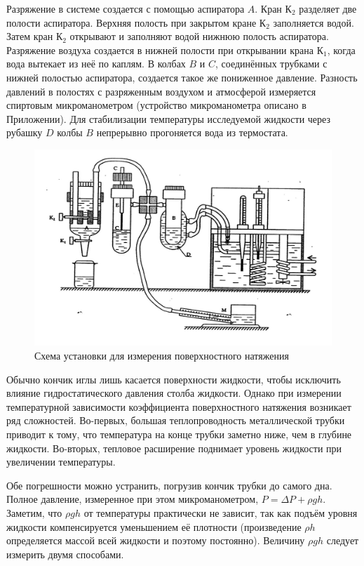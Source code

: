 \documentclass[a4paper, 12pt]{article} %
\begin{document}
\bigskip

Разряжение в системе создается с помощью аспиратора $A$. Кран К$_2$ разделяет две полости аспиратора. Верхняя полость при закрытом кране К$_2$ заполняется водой. Затем кран К$_2$ открывают и заполняют водой нижнюю полость аспиратора. Разряжение воздуха создается в нижней полости при открывании крана К$_1$, когда вода вытекает из неё по каплям. В колбах $B$ и $C$, соединённых трубками с нижней полостью аспиратора, создается такое же пониженное давление. Разность давлений в полостях с разряженным воздухом и атмосферой измеряется спиртовым микроманометром (устройство микроманометра описано в Приложении).
Для стабилизации температуры исследуемой жидкости через рубашку $D$ колбы $B$ непрерывно прогоняется вода из термостата.

\begin{figure}[h]
    \centering
    \includegraphics[width=1\textwidth]{Scheme.jpg}
    \caption{Схема установки для измерения поверхностного натяжения}
    \label{fig:vac}
\end{figure}


Обычно кончик иглы лишь касается поверхности жидкости, чтобы исключить влияние гидростатического давления столба жидкости. Однако при измерении температурной зависимости коэффициента поверхностного натяжения возникает ряд сложностей. Во-первых, большая теплопроводность металлической трубки приводит к тому, что температура на конце трубки заметно ниже, чем в глубине жидкости. Во-вторых, тепловое расширение поднимает уровень жидкости при увеличении температуры.

Обе погрешности можно устранить, погрузив кончик трубки до самого дна. Полное давление, измеренное при этом микроманометром, $P = \Delta P + \rho gh$. Заметим, что $\rho gh$ от температуры практически не зависит, так как подъём уровня жидкости компенсируется уменьшением её плотности (произведение $\rho h$ определяется массой всей жидкости и поэтому постоянно). Величину $\rho gh$ следует измерить двумя способами. 
\end{document}
